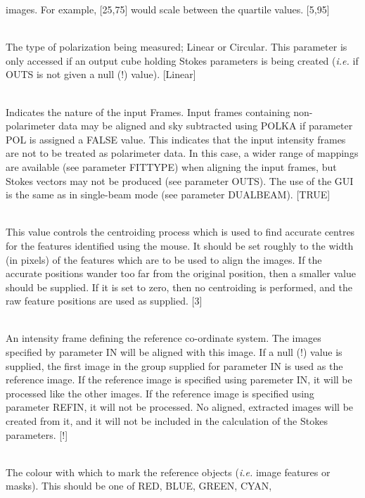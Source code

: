 \documentclass[twoside,11pt]{article}
\renewcommand{\_}{\texttt{\symbol{95}}}
\newcommand{\sstsubsection}[1]{ \item[{#1}] \mbox{} \\}
\newcommand{\sstsubsection}[1]{\item[{#1}]}
\begin{document}
{{{         images. For example, [25,75] would scale between the quartile
         values. [5,95]
      }
      \sstsubsection{
         PMODE = LITERAL (Read)
      }{
         The type of polarization being measured; Linear or Circular. This
         parameter is only accessed if an output cube holding Stokes
         parameters is being created (\emph{i.e.} if OUT\_S is not given a null (!)
         value). [Linear]
      }
      \sstsubsection{
         POL = \_LOGICAL (Read)
      }{
         Indicates the nature of the input Frames. Input frames containing
         non-polarimeter data may be aligned and sky subtracted using POLKA
         if parameter POL is assigned a FALSE value. This indicates that the
         input intensity frames are not to be treated as polarimeter data. In
         this case, a wider range of mappings are available (see parameter
         FITTYPE) when aligning the input frames, but Stokes vectors may not
         be produced (see parameter OUT\_S). The use of the GUI is the same as
         in single-beam mode (see parameter DUALBEAM). [TRUE]
      }
      \sstsubsection{
         PSFSIZE = \_INTEGER (Update)
      }{
         This value controls the centroiding process which is used to find
         accurate centres for the features identified using the mouse.
         It should be set roughly to the width (in pixels) of the
         features which are to be used to align the images. If the
         accurate positions wander too far from the original position, then
         a smaller value should be supplied. If it is set to zero, then
         no centroiding is performed, and the raw feature positions are
         used as supplied. [3]
      }
      \sstsubsection{
         REFIN = NDF (Read)
      }{
         An intensity frame defining the reference co-ordinate system.
         The images specified by parameter IN will be aligned with this
         image. If a null (!) value is supplied, the first image in the
         group supplied for parameter IN is used as the reference image.
         If the reference image is specified using paremeter IN, it will be
         processed like the other images. If the reference image is
         specified using parameter REFIN, it will not be processed. No
         aligned, extracted images will be created from it, and it will
         not be included in the calculation of the Stokes parameters. [!]
      }
      \sstsubsection{
         REFCOL = LITERAL (Update)
      }{
         The colour with which to mark the reference objects (\emph{i.e.} image
         features or masks). This should be one of RED, BLUE, GREEN, CYAN,
}}}
\end{document}
